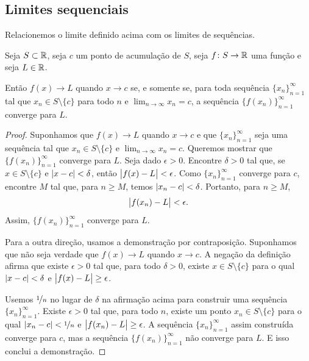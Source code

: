 \subsection{Limites sequenciais} \label{subseq:sequentiallimits}

Relacionemos o limite definido acima com os limites de sequências.

\begin{lemma}\label{seqflimit:lemma}
Seja $S \subset {\mathbb{R}}$, seja $c$ um ponto de acumulação de $S$, seja $f \colon S \to
{\mathbb{R}}$ uma função e seja $L \in {\mathbb{R}}$.

Então
$f(x) \to L$ quando $x \to c$ se, e somente se, para toda sequência
$\{ x_n \}_{n=1}^\infty$
tal que $x_n \in S \setminus \{c\}$ para todo $n$
e $\lim_{n\to\infty} x_n = c$,
a sequência $\bigl\{ f(x_n) \bigr\}_{n=1}^\infty$ converge para $L$.
\end{lemma}

\begin{proof}
Suponhamos que
$f(x) \to L$ quando $x \to c$ e que $\{ x_n \}_{n=1}^\infty$ seja uma sequência
tal que
$x_n \in S \setminus \{c\}$ e
$\lim_{n\to\infty} x_n = c$.
Queremos mostrar que $\bigl\{ f(x_n) \bigr\}_{n=1}^\infty$ converge para $L$.
Seja dado $\epsilon > 0$. Encontre $\delta > 0$ tal que, se
$x \in S \setminus \{c\}$ e $\lvert {x-c} \rvert < \delta$, então
$\bigl\lvert {f(x) - L} \bigr\rvert < \epsilon$. Como
$\{ x_n \}_{n=1}^\infty$ converge para $c$, encontre $M$ tal que, para $n \geq M$,
temos $\lvert {x_n - c} \rvert < \delta$. Portanto, para $n \geq M$,
\begin{equation*}
\bigl\lvert {f(x_n) - L} \bigr\rvert < \epsilon .
\end{equation*}
Assim, $\bigl\{ f(x_n) \bigr\}_{n=1}^\infty$ converge para $L$.

Para a outra direção, usamos a demonstração por contraposição. Suponhamos
que não seja verdade que $f(x) \to L$ quando $x \to c$. A negação da
definição afirma que existe $\epsilon > 0$ tal que, para todo
$\delta > 0$, existe $x \in S \setminus \{c\}$ para o qual
$\lvert {x-c} \rvert < \delta$
e $\bigl\lvert {f(x)-L} \bigr\rvert \geq \epsilon$.

Usemos $\nicefrac{1}{n}$ no lugar de $\delta$ na afirmação acima para
construir uma sequência $\{ x_n \}_{n=1}^\infty$. Existe
$\epsilon > 0$ tal que, para todo $n$,
existe um ponto $x_n \in S \setminus \{c\}$ para o qual
$\lvert {x_n-c} \rvert < \nicefrac{1}{n}$
e $\bigl\lvert {f(x_n)-L} \bigr\rvert \geq \epsilon$.
A sequência $\{ x_n \}_{n=1}^\infty$ assim construída converge para $c$, mas
a sequência $\bigl\{ f(x_n) \bigr\}_{n=1}^\infty$ não converge para $L$.
E isso conclui a demonstração.
\end{proof}

